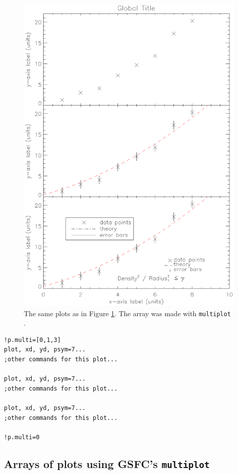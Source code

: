 \documentclass[psfig,preprint]{aastex}
\begin{document}
\begin{figure}[!ht]
\begin{center}
\includegraphics[scale=0.6]{bpfig2.ps}
\caption{The same plots as in Figure \ref{fig2}. The array was made 
with {\tt multiplot} . \label{fig2}}
\end{center}
\end{figure}

\begin{verbatim}
!p.multi=[0,1,3]
plot, xd, yd, psym=7...
;other commands for this plot...

plot, xd, yd, psym=7...
;other commands for this plot...

plot, xd, yd, psym=7...
;other commands for this plot...

!p.multi=0
\end{verbatim}

\subsection{Arrays of plots using GSFC's {\tt multiplot}} \label{multiplot}
\end{document}
